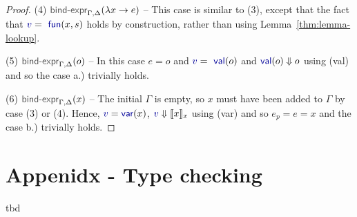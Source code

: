 \documentclass[acmsmall,anonymous,fleqn]{acmart}\settopmatter{printfolios=false,printccs=false,printacmref=false}
\theoremstyle{plain}
\theoremstyle{definition}
\newcommand{\ident}[1]{\textnormal{\textcolor{idclr}{\sffamily #1}}}
\newcommand{\bndclr}[1]{\textcolor{kvdclr}{#1}}
\newcommand{\bnd}[1]{\textnormal{\textcolor{kvdclr}{\sffamily #1}}}
\newcommand{\rname}[1]{{\sffamily\small(#1)}}
\begin{document}
\begin{proof}
\vspace{0.75em}\noindent(4) $\ident{bind-expr}_{\Gamma, \Delta}(\lambda x\rightarrow e)$  --
  This case is similar to (3), except that the fact that $\bndclr{v} = \bnd{fun}(x, s)$
  holds by construction, rather than using Lemma~\ref{thm:lemma-lookup}.

\vspace{0.75em}\noindent(5) $\ident{bind-expr}_{\Gamma, \Delta}(o)$ -- In this case $e=o$ and $\bndclr{v} = \bnd{val}(o)$
  and $\bnd{val}(o)\Downarrow o$ using \rname{val} and so the case a.) trivially holds.

\vspace{0.75em}\noindent(6) $\ident{bind-expr}_{\Gamma, \Delta}(x)$ -- The initial $\Gamma$ is empty,
  so $x$ must have been added to $\Gamma$ by case (3) or (4). Hence,
  $\bndclr{v}=\bnd{var}(x)$, $\bndclr{v}\Downarrow \llbracket x \rrbracket_{x}$ using \rname{var}
  and so $e_p = e = x$ and the case b.) trivially holds.

\end{proof}

\section{Appenidx - Type checking}
\label{sec:app-types}

tbd
\end{document}
